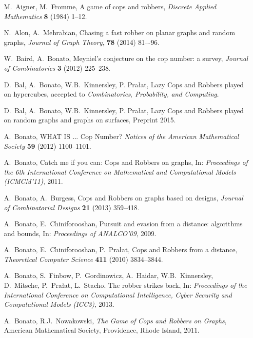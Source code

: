 \documentclass[12pt]{amsart}
\begin{document}
\begin{thebibliography}{99}

 M.\ Aigner, M.\ Fromme, A game of cops and robbers, \emph{Discrete Applied Mathematics} \textbf{8} (1984) 1--12.

 N.\ Alon, A.\ Mehrabian, Chasing a fast robber on planar graphs and random graphs, \emph{Journal of Graph Theory}, \textbf{78} (2014) 81–-96.

 W.~Baird, A.~Bonato, Meyniel's conjecture on the cop number: a survey, \emph{Journal of Combinatorics} \textbf{3} (2012) 225--238.

 D.\ Bal, A.\ Bonato, W.B.\ Kinnersley, P. Pra\l{}at, Lazy Cops and Robbers played on hypercubes,  accepted to \emph{Combinatorics, Probability, and Computing}.

 D.\ Bal, A.\ Bonato, W.B.\ Kinnersley, P. Pra\l{}at, Lazy Cops and Robbers played on random graphs and graphs on surfaces, Preprint 2015.

 A.\ Bonato, WHAT IS ... Cop Number? \emph{Notices of the American Mathematical Society} \textbf{59} (2012) 1100--1101.

 A.\ Bonato,  Catch me if you can: Cops and Robbers on graphs, In: \emph{Proceedings of the 6th International Conference on Mathematical and Computational Models (ICMCM'11)}, 2011.

 A.\ Bonato, A.\ Burgess, Cops and Robbers on graphs based on designs, \emph{Journal of Combinatorial Designs} \textbf{21} (2013) 359--418.

 A.\ Bonato, E.\ Chiniforooshan, Pursuit and evasion from a distance: algorithms and bounds,  In: \emph{Proceedings of ANALCO'09}, 2009.

 A.\ Bonato, E.\ Chiniforooshan, P.\ Pra{\l }at, Cops and Robbers from a distance, \emph{Theoretical Computer Science} \textbf{411} (2010) 3834--3844.

 A.\ Bonato, S.\ Finbow, P.\ Gordinowicz, A.\ Haidar, W.B.\ Kinnersley, D.\ Mitsche, P.\ Pra\l{}at, L.\ Stacho. The robber strikes back, In: \emph{Proceedings of the International
    Conference on Computational Intelligence, Cyber Security and Computational Models (ICC3)}, 2013.

 A.\ Bonato, R.J.\ Nowakowski, \emph{The Game of Cops and Robbers on Graphs}, American Mathematical Society, Providence, Rhode Island, 2011.


\end{thebibliography}
\end{document}
